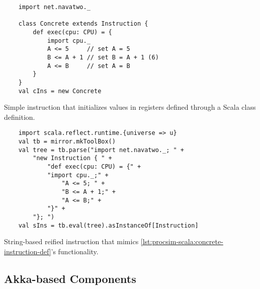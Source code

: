\begin{listing}[ht!]
    \begin{verbatim}
    import net.navatwo._
    
    class Concrete extends Instruction {
        def exec(cpu: CPU) = {
            import cpu._
            A <= 5     // set A = 5
            B <= A + 1 // set B = A + 1 (6)
            A <= B     // set A = B
        }
    }
    val cIns = new Concrete
    \end{verbatim}
    \caption{Simple instruction that initializes values in registers defined through a Scala class definition.}
    \label{lst:procsim-scala:concrete-instruction-def}
\end{listing}

\begin{listing}[hb!]
    \begin{verbatim}
    import scala.reflect.runtime.{universe => u}
    val tb = mirror.mkToolBox()
    val tree = tb.parse("import net.navatwo._; " +
        "new Instruction { " +
            "def exec(cpu: CPU) = {" +
            "import cpu._;" +
                "A <= 5; " +
                "B <= A + 1;" +
                "A <= B;" +
            "}" +
        "}; ")
    val sIns = tb.eval(tree).asInstanceOf[Instruction]
    \end{verbatim}
    \caption{String-based reified instruction that mimics \cref{lst:procsim-scala:concrete-instruction-def}'s functionality.}
    \label{lst:procsim-scala:reify-instruction-def}
\end{listing}

\subsection{Akka-based Components}

